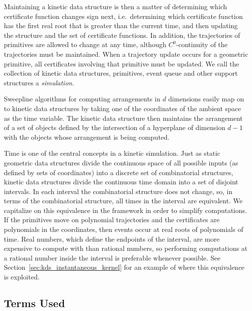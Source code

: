 Maintaining a kinetic data structure is then a matter of determining
which certificate function changes sign next, i.e.\ determining which
certificate function has the first real root that is greater than the
current time, and then updating the structure and the set of
certificate functions. In addition, the trajectories of primitives are
allowed to change at any time, although $C^0$-continuity of the
trajectories must be maintained.  When a trajectory update occurs for
a geometric primitive, all certificates involving that primitive must
be updated.  We call the collection of kinetic data structures,
primitives, event queue and other support structures a
{\em simulation}.

Sweepline algorithms for computing arrangements in $d$ dimensions
easily map on to kinetic data structures by taking one of the
coordinates of the ambient space as the time variable. The kinetic
data structure then maintains the arrangement of a set of objects
defined by the intersection of a hyperplane of dimension $d-1$ with
the objects whose arrangement is being computed. 


Time is one of the central concepts in a kinetic simulation.  Just as
static geometric data structures divide the continuous space of all
possible inputs (as defined by sets of coordinates) into a discrete
set of combinatorial structures, kinetic data structures divide the
continuous time domain into a set of disjoint intervals. In each
interval the combinatorial structure does not change, so, in terms of
the combinatorial structure, all times in the interval are equivalent.
We capitalize on this equivalence in the framework in order to
simplify computations. If the primitives move on polynomial
trajectories and the certificates are polynomials in the coordinates,
then events occur at real roots of polynomials of time. Real numbers,
which define the endpoints of the interval, are more expensive to
compute with than rational numbers, so performing computations at a
rational number inside the interval is preferable whenever
possible. See Section~\ref{sec:kds_instantaneous_kernel} for an example of
where this equivalence is exploited.

\subsection{Terms Used\label{sec:kds_terms}}


